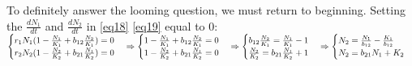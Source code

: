 \documentclass[11pt,a4paper]{scrartcl}
\theoremstyle{definition}
\begin{document}
To definitely answer the looming question, we must return to beginning.
Setting the $\frac{dN_1}{dt}$ and $\frac{dN_2}{dt}$ in \eqref{eq18} \eqref{eq19} equal to 0:
$\begin{cases} r_1N_1(1-\frac{N_1}{K_1}+b_{12}\frac{N_2}{K_1})=0 \\ r_2N_2(1-\frac{N_2}{K_2}+b_{21}\frac{N_1}{K_2})=0 \end{cases}\vspace{1em} \Rightarrow \begin{cases}1-\frac{N_1}{K_1}+b_{12}\frac{N_2}{K_1}=0 \\ 1-\frac{N_2}{K_2}+b_{21}\frac{N_1}{K_2}=0 \end{cases} \Rightarrow \begin{cases}b_{12}\frac{N_2}{K_1}=\frac{N_1}{K_1}-1 \\ \frac{N_2}{K_2}=b_{21}\frac{N_1}{K_2}+1 \end{cases} \Rightarrow \begin{cases} N_2=\frac{N_1}{b_{12}}-\frac{K_1}{b_{12}} \\ N_2=b_{21}N_1+K_2 \end{cases}$\newline\newline
\end{document}
